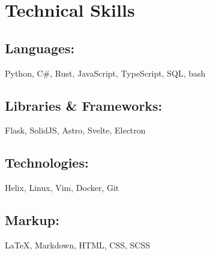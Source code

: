 \section{Technical Skills}

\subsection{Languages:} Python, C\#, Rust, JavaScript, TypeScript, SQL, bash
\subsection{Libraries \& Frameworks:} Flask, SolidJS, Astro, Svelte, Electron
\subsection{Technologies:} Helix, Linux, Vim, Docker, Git
\subsection{Markup:} {\LaTeX}, Markdown, HTML, CSS, SCSS
